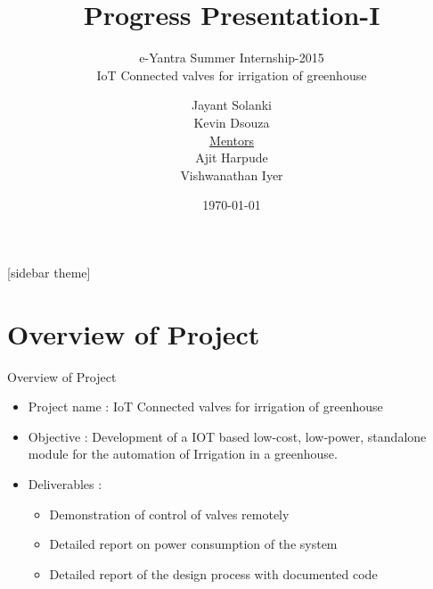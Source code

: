 \documentclass[10pt, a4paper]{beamer}
\begin{document}
	\title{Progress Presentation-I}
	\subtitle{e-Yantra Summer Internship-2015 \\ IoT Connected valves for irrigation of greenhouse}
	\author{ Jayant Solanki \\ Kevin Dsouza\\ \vspace{0.5cm}
	\underline{Mentors} \\ Ajit Harpude \\Vishwanathan Iyer\\}
	\date{\today}
	\frame{\titlepage}

[sidebar theme]
\section{Overview of Project}
\begin{frame}{Overview of Project}
	\begin{itemize}
		\item Project name : IoT Connected valves for irrigation of greenhouse
		\item Objective : Development of a IOT based low-cost, low-power, standalone module for the automation of Irrigation in a greenhouse.
	        \item Deliverables : 
		\begin{itemize}
		\item Demonstration of control of valves remotely
                \item Detailed report on power consumption of the system
                \item Detailed report of the design process with documented code
                \end{itemize}
	\end{itemize}
\end{frame}
\end{document}
